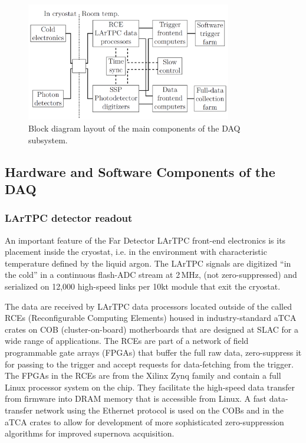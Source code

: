\begin{figure}[h!]
	\centering
	\includegraphics[width=0.8\textwidth]{daq-block-diagram.png}
	\caption{Block diagram layout of the main components of the DAQ subsystem.}
	\label{fig:fddaqblock}
\end{figure}


\subsection{Hardware and Software Components of the DAQ}
\subsubsection{LArTPC detector readout}
An important feature of the Far Detector LArTPC front-end electronics is its placement inside
the cryostat, i.e. in the environment  with characteristic temperature defined by the liquid argon.
The LArTPC signals are digitized ``in the cold'' in a continuous flash-ADC stream at 2\,MHz, (not zero-suppressed)
and serialized on 12,000 high-speed links per 10kt module that exit the cryostat.

The data are received by LArTPC data processors located outside of the called RCEs \cite{slac_rce_1} (Reconfigurable
Computing Elements) housed in industry-standard aTCA crates on COB (cluster-on-board)
motherboards that are designed at SLAC for a wide range of applications.  The RCEs are part of a
network of field programmable gate arrays (FPGAs) that buffer the full raw data,
zero-suppress it for passing to the trigger and accept requests for
data-fetching from the trigger.  The FPGAs in the RCEs are from the
Xilinx Zynq family and contain a full Linux processor system on the
chip.  They facilitate the high-speed data transfer from firmware into
DRAM memory that is accessible from Linux.  A fast data-transfer
network using the Ethernet protocol is used on the COBs and in the
aTCA crates to allow for development of more sophisticated zero-suppression algorithms
for improved supernova acquisition.


